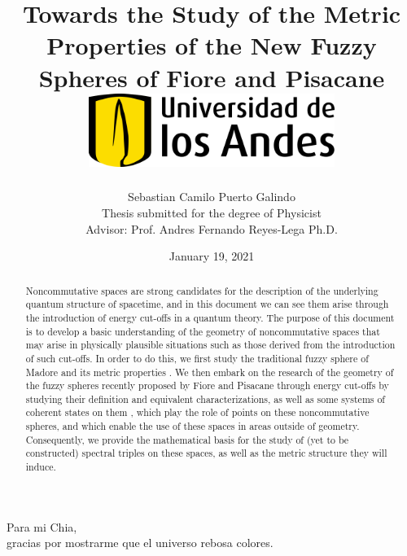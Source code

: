 \documentclass[12pt]{report}
\title 
{
	{Towards the Study of the Metric Properties of the New Fuzzy Spheres of Fiore and Pisacane}\\
	\vspace{1.5cm}
	{\includegraphics[width = 0.6\textwidth]{logo.png}}	
}
\author{Sebastian Camilo Puerto Galindo\\[1cm]{\small Thesis submitted for the degree of Physicist}\\ {\small  Advisor: Prof. Andres Fernando Reyes-Lega Ph.D.}}
\date{January 19, 2021}
\newenvironment{dedication}
  {\clearpage           %
   \thispagestyle{empty}%
   \vspace*{\stretch{1}}%
   \raggedleft          %
  }
  {\par %
   \vspace{\stretch{3}} %
   \clearpage           %
  }
\theoremstyle{definition}
\begin{document}

\maketitle

\begin{dedication}
{\LARGE\calligra Para mi Chia,\\ gracias por mostrarme que el universo rebosa colores.}
\end{dedication}

\begin{abstract}
Noncommutative spaces are strong candidates for the description of the underlying quantum structure of spacetime, and in this document we can see them arise through the introduction of energy cut-offs in a quantum theory. The purpose of this document is to develop a basic understanding of the geometry of noncommutative spaces that may arise in physically plausible situations such as those derived from the introduction of such cut-offs. In order to do this, we first study the traditional fuzzy sphere of Madore \cite{Madore} and its metric properties \cite{DAndrea2013}. We then embark on the research of the geometry of the fuzzy spheres recently proposed by Fiore and Pisacane \cite{Fiore2018} through energy cut-offs by studying their definition and equivalent characterizations, as well as some systems of coherent states on them \cite{FioreCoherent2020, FioreXi2020}, which play the role of points on these noncommutative spheres, and which enable the use of these spaces in areas outside of geometry. Consequently, we provide the mathematical basis for the  study of (yet to be constructed) spectral triples on these spaces, as well as the metric structure they will induce. %
\end{abstract}
\end{document}
